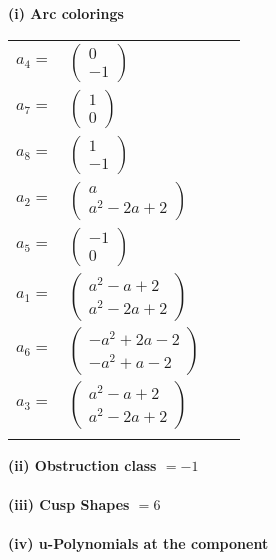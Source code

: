 \documentclass[1p]{elsarticle_modified}
\theoremstyle{definition}
\begin{document}
\flushleft \textbf{(i) Arc colorings}\\
\begin{tabular}{m{7pt} m{180pt} m{7pt} m{180pt} }
\flushright $a_{4}=$&$\begin{pmatrix}0\\-1\end{pmatrix}$ \\
\flushright $a_{7}=$&$\begin{pmatrix}1\\0\end{pmatrix}$ \\
\flushright $a_{8}=$&$\begin{pmatrix}1\\-1\end{pmatrix}$ \\
\flushright $a_{2}=$&$\begin{pmatrix}a\\a^2-2 a+2\end{pmatrix}$ \\
\flushright $a_{5}=$&$\begin{pmatrix}-1\\0\end{pmatrix}$ \\
\flushright $a_{1}=$&$\begin{pmatrix}a^2- a+2\\a^2-2 a+2\end{pmatrix}$ \\
\flushright $a_{6}=$&$\begin{pmatrix}- a^2+2 a-2\\- a^2+a-2\end{pmatrix}$ \\
\flushright $a_{3}=$&$\begin{pmatrix}a^2- a+2\\a^2-2 a+2\end{pmatrix}$\\&\end{tabular}
\flushleft \textbf{(ii) Obstruction class $= -1$}\\~\\
\flushleft \textbf{(iii) Cusp Shapes $= 6$}\\~\\
\newpage\renewcommand{\arraystretch}{1}
\flushleft \textbf{(iv) u-Polynomials at the component}\newline \\
\end{document}

